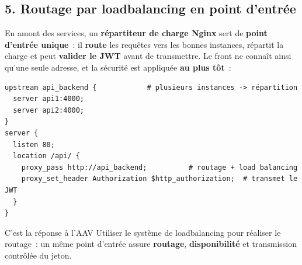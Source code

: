\newpage

\subsection*{5. Routage par loadbalancing en point d'entrée}
{}
\noindent En amont des services, un \textbf{répartiteur de charge Nginx} sert de \textbf{point d'entrée unique}~: il \textbf{route} les requêtes vers les bonnes instances, répartit la charge et peut \textbf{valider le JWT} avant de transmettre. Le front ne connaît ainsi qu'une seule adresse, et la sécurité est appliquée \textbf{au plus tôt}~:

\begin{verbatim}
upstream api_backend {            # plusieurs instances -> répartition
  server api1:4000;
  server api2:4000;
}
server {
  listen 80;
  location /api/ {
    proxy_pass http://api_backend;          # routage + load balancing
    proxy_set_header Authorization $http_authorization;  # transmet le JWT
  }
}
\end{verbatim}
\noindent C'est la réponse à l'AAV \og{}Utiliser le système de loadbalancing pour réaliser le routage\fg{}~: un même point d'entrée assure \textbf{routage}, \textbf{disponibilité} et transmission contrôlée du jeton.

\vspace{0.4cm}

